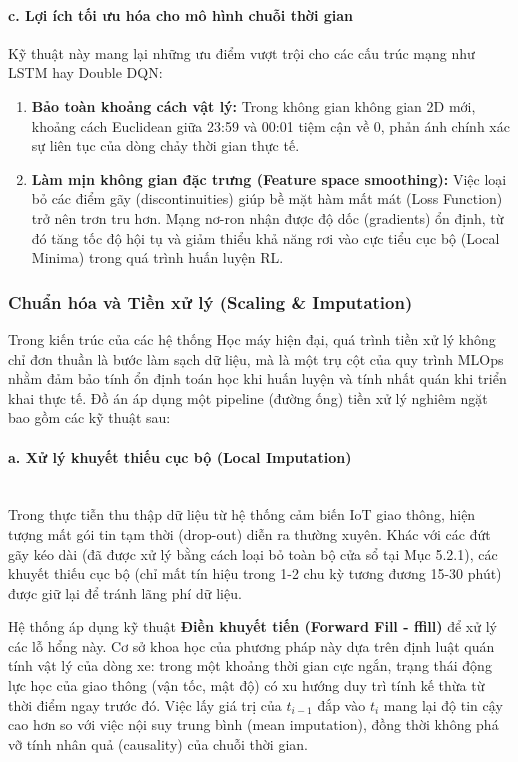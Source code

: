 \paragraph{c. Lợi ích tối ưu hóa cho mô hình chuỗi thời gian}
Kỹ thuật này mang lại những ưu điểm vượt trội cho các cấu trúc mạng như LSTM hay Double DQN:
\begin{enumerate}
    \item \textbf{Bảo toàn khoảng cách vật lý:} Trong không gian không gian 2D mới, khoảng cách Euclidean giữa 23:59 và 00:01 tiệm cận về $0$, phản ánh chính xác sự liên tục của dòng chảy thời gian thực tế.
    \item \textbf{Làm mịn không gian đặc trưng (Feature space smoothing):} Việc loại bỏ các điểm gãy (discontinuities) giúp bề mặt hàm mất mát (Loss Function) trở nên trơn tru hơn. Mạng nơ-ron nhận được độ dốc (gradients) ổn định, từ đó tăng tốc độ hội tụ và giảm thiểu khả năng rơi vào cực tiểu cục bộ (Local Minima) trong quá trình huấn luyện RL.
\end{enumerate}

\subsubsection{Chuẩn hóa và Tiền xử lý (Scaling \& Imputation)}

Trong kiến trúc của các hệ thống Học máy hiện đại, quá trình tiền xử lý không chỉ đơn thuần là bước làm sạch dữ liệu, mà là một trụ cột của quy trình MLOps nhằm đảm bảo tính ổn định toán học khi huấn luyện và tính nhất quán khi triển khai thực tế. Đồ án áp dụng một pipeline (đường ống) tiền xử lý nghiêm ngặt bao gồm các kỹ thuật sau:

\paragraph{a. Xử lý khuyết thiếu cục bộ (Local Imputation)} \mbox{} \\
Trong thực tiễn thu thập dữ liệu từ hệ thống cảm biến IoT giao thông, hiện tượng mất gói tin tạm thời (drop-out) diễn ra thường xuyên. Khác với các đứt gãy kéo dài (đã được xử lý bằng cách loại bỏ toàn bộ cửa sổ tại Mục 5.2.1), các khuyết thiếu cục bộ (chỉ mất tín hiệu trong 1-2 chu kỳ tương đương 15-30 phút) được giữ lại để tránh lãng phí dữ liệu.

Hệ thống áp dụng kỹ thuật \textbf{Điền khuyết tiến (Forward Fill - ffill)} để xử lý các lỗ hổng này. Cơ sở khoa học của phương pháp này dựa trên định luật quán tính vật lý của dòng xe: trong một khoảng thời gian cực ngắn, trạng thái động lực học của giao thông (vận tốc, mật độ) có xu hướng duy trì tính kế thừa từ thời điểm ngay trước đó. Việc lấy giá trị của $t_{i-1}$ đắp vào $t_i$ mang lại độ tin cậy cao hơn so với việc nội suy trung bình (mean imputation), đồng thời không phá vỡ tính nhân quả (causality) của chuỗi thời gian.

